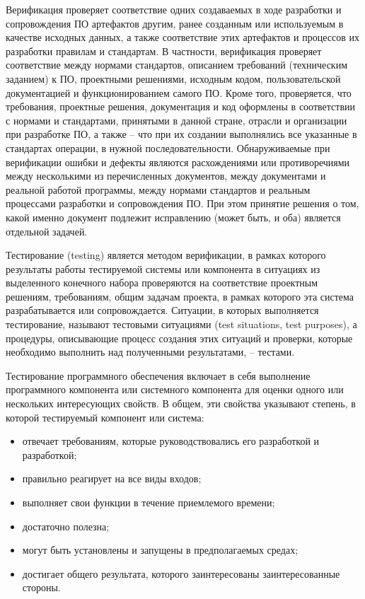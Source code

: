Верификация проверяет соответствие одних создаваемых в ходе разработки и сопровождения ПО артефактов другим, ранее созданным или используемым в качестве исходных данных, а также соответствие этих артефактов и процессов их разработки правилам и стандартам. В частности, верификация проверяет соответствие между нормами стандартов, описанием требований (техническим заданием) к ПО, проектными решениями, исходным кодом, пользовательской документацией и функционированием самого ПО. Кроме того, проверяется, что требования, проектные решения, документация и код оформлены в соответствии с нормами и стандартами, принятыми в данной стране, отрасли и организации при разработке ПО, а также – что при их создании выполнялись все указанные в стандартах операции, в нужной последовательности. Обнаруживаемые при верификации ошибки и дефекты являются расхождениями или противоречиями между несколькими из перечисленных документов, между документами и реальной работой программы, между нормами стандартов и реальным процессами разработки и сопровождения ПО. При этом принятие решения о том, какой именно документ подлежит исправлению (может быть, и оба) является отдельной задачей.

Тестирование (testing) является методом верификации, в рамках которого результаты работы тестируемой системы или компонента в ситуациях из выделенного конечного набора проверяются на соответствие проектным решениям, требованиям, общим задачам проекта, в рамках которого эта система разрабатывается или сопровождается. Ситуации, в которых выполняется тестирование, называют тестовыми ситуациями (test situations, test purposes), а процедуры, описывающие процесс создания этих ситуаций и проверки, которые необходимо выполнить над полученными результатами, – тестами.

Тестирование программного обеспечения включает в себя выполнение программного компонента или системного компонента для оценки одного или нескольких интересующих свойств. В общем, эти свойства указывают степень, в которой тестируемый компонент или система:
\begin{itemize}
	\item отвечает требованиям, которые руководствовались его разработкой и разработкой;
	\item правильно реагирует на все виды входов;
	\item выполняет свои функции в течение приемлемого времени;
	\item достаточно полезна;
	\item могут быть установлены и запущены в предполагаемых средах;
	\item достигает общего результата, которого заинтересованы заинтересованные стороны.
\end{itemize}

